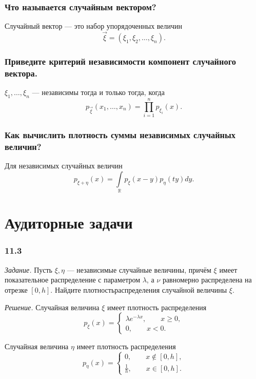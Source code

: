 \subsubsection*{Что называется случайным вектором?}

Случайный вектор --- это набор упорядоченных величин
$$ \vec{ \xi } =
\left( \xi_1, \xi_2, \dotsc, \xi_n \right).$$

\subsubsection*{Приведите критерий независимости компонент случайного вектора.}

$ \xi_1, \dotsc, \xi_n$ --- независимы тогда и только тогда, когда
$$p_{ \vec{ \xi }} \left( x_1, \dotsc, x_n \right) =
\prod \limits_{i=1}^n p_{ \xi_i} \left( x \right).$$

\subsubsection*{Как вычислить плотность суммы независимых случайных величин?}

Для независимых случайных величин
$$p_{ \xi + \eta } \left( x \right) =
\int \limits_{ \mathbb{R}} p_{ \xi } \left( x-y \right) p_{ \eta } \left(t y \right) dy.$$

\section*{Аудиторные задачи}

\subsubsection*{11.3}

\textit{Задание.} Пусть $ \xi, \eta $ --- независимые случайные величины, причём $ \xi $ имеет показательное распределение с параметром $ \lambda $, а $ \nu $ равномерно распределена на отрезке $ \left[ 0, h \right] $.
Найдите плотностьраспределения случайной величины $ \xi $. 

\textit{Решение.} Случайная величина $ \xi $ имеет плотность распределения
$$p_{ \xi } \left( x \right) =
\begin{cases}
\lambda e^{- \lambda x}, \qquad x \geq 0, \\
0, \qquad x < 0.
\end{cases}$$

Случайная величина $ \eta $ имеет плотность распределения
$$p_{ \eta } \left( x \right) =
\begin{cases}
0, \qquad x \notin \left[ 0, h \right], \\
\frac{1}{h}, \qquad x \in \left[ 0, h \right].
\end{cases}$$

